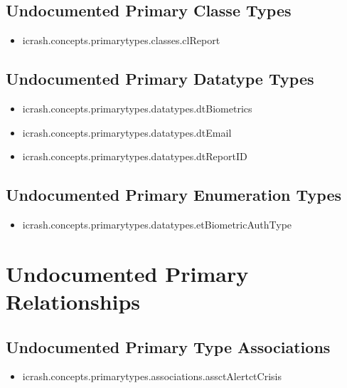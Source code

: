 \subsection[Undocumented Primary Classe Types]{Undocumented Primary Classe Types}
\begin{itemize}
\item icrash.concepts.primarytypes.classes.clReport 
\end{itemize}

\subsection[Undocumented Primary Datatype Types]{Undocumented Primary Datatype Types}
\begin{itemize}
\item icrash.concepts.primarytypes.datatypes.dtBiometrics 
\item icrash.concepts.primarytypes.datatypes.dtEmail 
\item icrash.concepts.primarytypes.datatypes.dtReportID 
\end{itemize}

\subsection[Undocumented Primary Enumeration Types]{Undocumented Primary Enumeration Types}
\begin{itemize}
\item icrash.concepts.primarytypes.datatypes.etBiometricAuthType 
\end{itemize}






\section[Undocumented Primary Type Relationships]{Undocumented Primary Relationships}

\subsection[Undocumented Primary Type Associations]{Undocumented Primary Type Associations}
\begin{itemize}
\item icrash.concepts.primarytypes.associations.assctAlertctCrisis 
\end{itemize}








